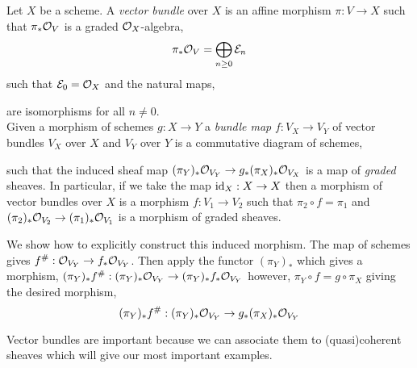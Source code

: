 \documentclass[12pt]{article}
\begin{document}
\begin{definition}
Let $X$ be a scheme. A \textit{vector bundle} over $X$ is an affine morphism $\pi : V \to X$ such that $\pi_* \mathcal{O}_{V}$ is a graded $\mathcal{O}_{X}$-algebra,
\[ \pi_* \mathcal{O}_{V} = \bigoplus_{n \ge 0} \mathcal{E}_n \]
such that $\mathcal{E}_0 = \mathcal{O}_{X}$ and the natural maps,
\begin{center}
\end{center}
are isomorphisms for all $n \ne 0$. 
\bigskip\\
Given a morphism of schemes $g : X \to Y$ a \textit{bundle map} $f : V_X \to V_Y$  of vector bundles $V_X$ over $X$ and $V_Y$ over $Y$ is a commutative diagram of schemes,
\begin{center}
\end{center}
such that the induced sheaf map $(\pi_Y)_* \mathcal{O}_{V_Y} \to g_* (\pi_X)_* \mathcal{O}_{V_X}$ is a map of \textit{graded} sheaves. In particular, if we take the map $\mathrm{id}_X : X \to X$ then a morphism of vector bundles over $X$ is a morphism $f : V_1 \to V_2$ such that $\pi_2 \circ f = \pi_1$ and $(\pi_2)_* \mathcal{O}_{V_2} \to (\pi_1)_* \mathcal{O}_{V_1}$ is a morphism of graded sheaves.
\end{definition}

\begin{remark}
We show how to explicitly construct this induced morphism. The map of schemes gives $f^\# : \mathcal{O}_{V_Y} \to f_* \mathcal{O}_{V_Y}$. Then apply the functor $(\pi_Y)_*$ which gives a morphism, $(\pi_Y)_* f^\# :  (\pi_Y)_* \mathcal{O}_{V_Y} \to (\pi_Y)_* f_* \mathcal{O}_{V_Y}$ however, $\pi_Y \circ f = g \circ \pi_X$ giving the desired morphism,
\[ (\pi_Y)_* f^\# :  (\pi_Y)_* \mathcal{O}_{V_Y} \to g_* (\pi_X)_* \mathcal{O}_{V_Y} \]
\end{remark}

\begin{remark}
Vector bundles are important because we can associate them to (quasi)coherent sheaves which will give our most important examples. 
\end{remark}

\newcommand{\V}{\mathbf{V}}
\end{document}

